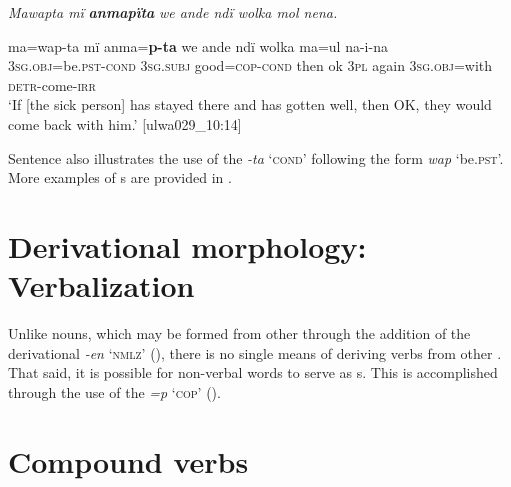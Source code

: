 \ea%
    \label{ex:verbs:95}

          \textit{Mawapta mï} \textbf{\textit{anmapïta}} \textit{we ande ndï wolka mol nena.}

\gll    ma=wap-ta         mï      anma=\textbf{p-ta}      we     ande    ndï  wolka  ma=ul      na-i-na\\
    \textsc{3sg.obj}=be.\textsc{pst-cond}  \textsc{3sg.subj}  good=\textsc{cop-cond}  then  ok    \textsc{3pl}  again  3\textsc{sg.obj=}with  \textsc{detr}{}-come-\textsc{irr}\\


\glt `If [the sick person] has stayed there and has gotten well, then OK, they would come back with him.’ [ulwa029\_10:14]
\z

Sentence  also illustrates the use of the   \textit{-ta} ‘\textsc{cond}’ following the   form \textit{wap} ‘be.\textsc{pst}’. More examples of s are provided in .



\section{Derivational morphology: Verbalization}\label{sec:4.13}


Unlike nouns, which may be formed from other  through the addition of the derivational  \textit{-en} ‘\textsc{nmlz}’ (), there is no single means of deriving verbs from other . That said, it is possible for  non-verbal words to serve as s. This is accomplished through the use of the  \textit{=p} ‘\textsc{cop}’ ().


\section{Compound verbs}\label{sec:4.14}


